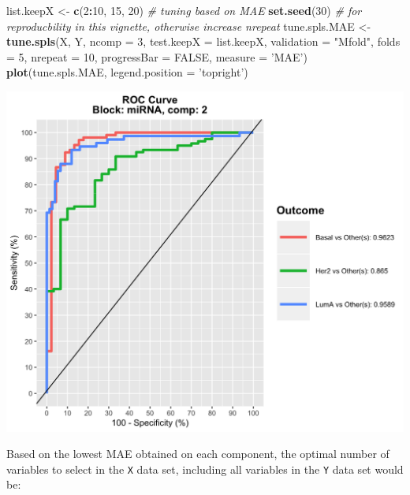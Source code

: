 \documentclass[]{book}
\newenvironment{Shaded}{\begin{snugshade}}{\end{snugshade}}
\newcommand{\KeywordTok}[1]{\textcolor[rgb]{0.13,0.29,0.53}{\textbf{#1}}}
\newcommand{\DataTypeTok}[1]{\textcolor[rgb]{0.13,0.29,0.53}{#1}}
\newcommand{\DecValTok}[1]{\textcolor[rgb]{0.00,0.00,0.81}{#1}}
\newcommand{\StringTok}[1]{\textcolor[rgb]{0.31,0.60,0.02}{#1}}
\newcommand{\CommentTok}[1]{\textcolor[rgb]{0.56,0.35,0.01}{\textit{#1}}}
\newcommand{\OtherTok}[1]{\textcolor[rgb]{0.56,0.35,0.01}{#1}}
\newcommand{\OperatorTok}[1]{\textcolor[rgb]{0.81,0.36,0.00}{\textbf{#1}}}
\newcommand{\NormalTok}[1]{#1}
\theoremstyle{definition}
\theoremstyle{definition}
\theoremstyle{definition}
\theoremstyle{remark}
\begin{document}
\begin{Shaded}
\begin{Highlighting}[]
\NormalTok{list.keepX <-}\StringTok{ }\KeywordTok{c}\NormalTok{(}\DecValTok{2}\OperatorTok{:}\DecValTok{10}\NormalTok{, }\DecValTok{15}\NormalTok{, }\DecValTok{20}\NormalTok{)}
\CommentTok{# tuning based on MAE}
\KeywordTok{set.seed}\NormalTok{(}\DecValTok{30}\NormalTok{) }\CommentTok{# for reproducbility in this vignette, otherwise increase nrepeat}
\NormalTok{tune.spls.MAE <-}\StringTok{ }\KeywordTok{tune.spls}\NormalTok{(X, Y, }\DataTypeTok{ncomp =} \DecValTok{3}\NormalTok{,}
                           \DataTypeTok{test.keepX =}\NormalTok{ list.keepX,}
                           \DataTypeTok{validation =} \StringTok{"Mfold"}\NormalTok{, }\DataTypeTok{folds =} \DecValTok{5}\NormalTok{,}
                           \DataTypeTok{nrepeat =} \DecValTok{10}\NormalTok{, }\DataTypeTok{progressBar =} \OtherTok{FALSE}\NormalTok{,}
                           \DataTypeTok{measure =} \StringTok{'MAE'}\NormalTok{)}
\KeywordTok{plot}\NormalTok{(tune.spls.MAE, }\DataTypeTok{legend.position =} \StringTok{'topright'}\NormalTok{)}
\end{Highlighting}
\end{Shaded}

\begin{center}\includegraphics[width=0.5\linewidth]{Figures/unnamed-chunk-12-1} \end{center}

Based on the lowest MAE obtained on each component, the optimal number
of variables to select in the \texttt{X} data set, including all
variables in the \texttt{Y} data set would be:

\begin{Shaded}
\end{Shaded}
\end{document}
